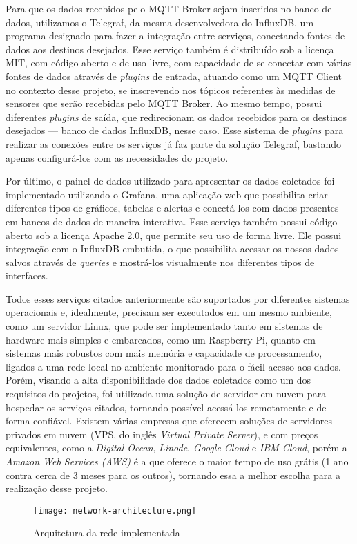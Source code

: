 \documentclass[../monografia.tex]{subfiles}
\begin{document}
Para que os dados recebidos pelo MQTT Broker sejam inseridos no banco de dados, utilizamos o Telegraf, da mesma desenvolvedora do InfluxDB, um programa designado para fazer a integração entre serviços, conectando fontes de dados aos destinos desejados. Esse serviço também é distribuído sob a licença MIT, com código aberto e de uso livre, com capacidade de se conectar com várias fontes de dados através de \textit{plugins} de entrada, atuando como um MQTT Client no contexto desse projeto, se inscrevendo nos tópicos referentes às medidas de sensores que serão recebidas pelo MQTT Broker. Ao mesmo tempo, possui diferentes \textit{plugins} de saída, que redirecionam os dados recebidos para os destinos desejados --- banco de dados InfluxDB, nesse caso. Esse sistema de \textit{plugins} para realizar as conexões entre os serviços já faz parte da solução Telegraf, bastando apenas configurá-los com as necessidades do projeto.

Por último, o painel de dados utilizado para apresentar os dados coletados foi implementado utilizando o Grafana, uma aplicação web que possibilita criar diferentes tipos de gráficos, tabelas e alertas e conectá-los com dados presentes em bancos de dados de maneira interativa. Esse serviço também possui código aberto sob a licença Apache 2.0, que permite seu uso de forma livre. Ele possui integração com o InfluxDB embutida, o que possibilita acessar os nossos dados salvos através de \textit{queries} e mostrá-los visualmente nos diferentes tipos de interfaces.



Todos esses serviços citados anteriormente são suportados por diferentes sistemas operacionais e, idealmente, precisam ser executados em um mesmo ambiente, como um servidor Linux, que pode ser implementado tanto em sistemas de hardware mais simples e embarcados, como um Raspberry Pi, quanto em sistemas mais robustos com mais memória e capacidade de processamento, ligados a uma rede local no ambiente monitorado para o fácil acesso aos dados. Porém, visando a alta disponibilidade dos dados coletados como um dos requisitos do projetos, foi utilizada uma solução de servidor em nuvem para hospedar os serviços citados, tornando possível acessá-los remotamente e de forma confiável. Existem várias empresas que oferecem soluções de servidores privados em nuvem (VPS, do inglês \textit{Virtual Private Server}), e com preços equivalentes, como a \textit{Digital Ocean}, \textit{Linode}, \textit{Google Cloud} e \textit{IBM Cloud}, porém a \textit{Amazon Web Services (AWS)} é a que oferece o maior tempo de uso grátis (1 ano contra cerca de 3 meses para os outros), tornando essa a melhor escolha para a realização desse projeto. 


\begin{figure}[h!]
	\centering
	\texttt{[image: network-architecture.png]}
	\caption{Arquitetura da rede implementada}
	\label{fig:network-architecture}
\end{figure}

\end{document}
